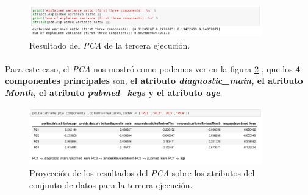 \begin{figure}[!htb]
  \centering
    \includegraphics[width=0.9\textwidth]{images/resultados_procesado_de_datos_pca3_result.png}
    \caption{Resultado del \textit{PCA} de la tercera ejecución.}
  \label{pcaThreeResult}
\end{figure}

\paragraph{}
Para este caso, el \textit{PCA} nos mostró como podemos ver en la figura \ref{pcaThreeAtributos} , que los \textbf{4 componentes principales} son, \textbf{el atributo \textit{diagnostic\_main}, el atributo \textit{Month}, el atributo \textit{pubmed\_keys} y el atributo \textit{age}}.

\begin{figure}[!htb]
  \centering
    \includegraphics[width=0.9\textwidth]{images/resultados_procesado_de_datos_pca3_atributos.png}
    \caption{Proyección de los resultados del \textit{PCA} sobre los atributos del conjunto de datos para la tercera ejecución.}
  \label{pcaThreeAtributos}
\end{figure}
